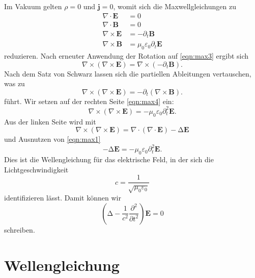 \documentclass{scrartcl}
\begin{document}
Im Vakuum gelten $\rho = 0$ und $\symbf{j} = 0$, womit sich die Maxwellgleichungen zu
\begin{align}
  \nabla \cdot  \symbf{E} &= 0 \label{eqn:max1} \\
  \nabla \cdot  \symbf{B} &= 0 \label{eqn:max2} \\
  \nabla \times \symbf{E} &= - \partial_t \symbf{B} \label{eqn:max3} \\
  \nabla \times \symbf{B} &= \mu_0 \varepsilon_0 \partial_t \symbf{E} \label{eqn:max4}
\end{align}
reduzieren.
Nach erneuter Anwendung der Rotation auf \eqref{eqn:max3} ergibt sich
\begin{equation}
  \nabla \times \left( \nabla \times \symbf{E} \right) = \nabla \times \left( - \partial_t \symbf{B} \right) .
\end{equation}
Nach dem Satz von Schwarz lassen sich die partiellen Ableitungen vertauschen, was zu
\begin{equation}
  \nabla \times \left( \nabla \times \symbf{E} \right) = - \partial_t \! \left( \nabla \times \symbf{B} \right) .
\end{equation}
führt.
Wir setzen auf der rechten Seite \eqref{eqn:max4} ein:
\begin{equation}
  \nabla \times \left( \nabla \times \symbf{E} \right) = - \mu_0 \varepsilon_0 \partial_t^2 \symbf{E} .
\end{equation}
Aus der linken Seite wird mit
\begin{equation}
  \nabla \times \left( \nabla \times \symbf{E} \right) = \nabla \cdot \left( \nabla \cdot \symbf{E} \right) - \increment \symbf{E}
\end{equation}
und Ausnutzen von \eqref{eqn:max1}
\begin{equation}
  - \increment\symbf{E} = -\mu_0 \varepsilon_0 \partial_t^2 \symbf{E} .
\end{equation}
Dies ist die Wellengleichung für das elektrische Feld, in der sich die Lichtgeschwindigkeit
\begin{equation}
  c = \frac{1}{\sqrt{\mu_0 \varepsilon_0}}
\end{equation}
identifizieren lässt.
Damit können wir
\begin{equation}
  \left(\increment - \frac{1}{c^2} \frac{\partial^2}{\partial t^2} \right) \! \symbf{E} = 0
\end{equation}
schreiben.

\section{Wellengleichung}
\end{document}
